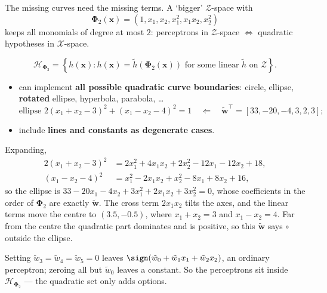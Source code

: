 The missing curves need the missing terms. A `bigger' \(\mathcal{Z}\)-space
with
\[
    \bm{\Phi}_2(\bm{x}) = (1, x_1, x_2, x_1^2, x_1 x_2, x_2^2)
\]
keeps all monomials of degree at most \(2\): perceptrons in
\(\mathcal{Z}\)-space \(\iff\) quadratic hypotheses in \(\mathcal{X}\)-space.

\begin{definition}\label{def:quad-hyp-set}
    \[
        \mathcal{H}_{\bm{\Phi}_2} = \left\{ h(\bm{x}) : h(\bm{x}) = \tilde{h}
        \left( \bm{\Phi}_2(\bm{x}) \right) \text{ for some linear } \tilde{h}
        \text{ on } \mathcal{Z} \right\} .
    \]
\end{definition}

\begin{itemize}
    \item can implement \textbf{all possible quadratic curve boundaries}:
        circle, ellipse, \textbf{rotated} ellipse, hyperbola, parabola,
        \ldots
        \[
            \text{ellipse } 2(x_1 + x_2 - 3)^2 + (x_1 - x_2 - 4)^2 = 1
            \quad \Longleftarrow \quad \tilde{\bm{w}}^\top = [33, -20, -4, 3,
            2, 3] ;
        \]
    \item include \textbf{lines and constants as degenerate cases}.
\end{itemize}

\begin{eg}
    Expanding,
    \begin{align*}
        2(x_1 + x_2 - 3)^2 &= 2x_1^2 + 4x_1 x_2 + 2x_2^2 - 12x_1 - 12x_2 + 18,\\
        (x_1 - x_2 - 4)^2 &= x_1^2 - 2x_1 x_2 + x_2^2 - 8x_1 + 8x_2 + 16,
    \end{align*}
    so the ellipse is \(33 - 20x_1 - 4x_2 + 3x_1^2 + 2x_1 x_2 + 3x_2^2 = 0\),
    whose coefficients in the order of \(\bm{\Phi}_2\) are exactly
    \(\tilde{\bm{w}}\). The cross term \(2x_1 x_2\) tilts the axes, and the
    linear terms move the centre to \((3.5, -0.5)\), where \(x_1 + x_2 = 3\)
    and \(x_1 - x_2 = 4\). Far from the centre the quadratic part dominates and
    is positive, so this \(\tilde{\bm{w}}\) says \(\circ\) outside the ellipse.
\end{eg}

Setting \(\tilde{w}_3 = \tilde{w}_4 = \tilde{w}_5 = 0\) leaves \(\sign(\tilde{w}_0
+ \tilde{w}_1 x_1 + \tilde{w}_2 x_2)\), an ordinary perceptron; zeroing all but
\(\tilde{w}_0\) leaves a constant. So the perceptrons sit inside
\(\mathcal{H}_{\bm{\Phi}_2}\) --- the quadratic set only adds options.

